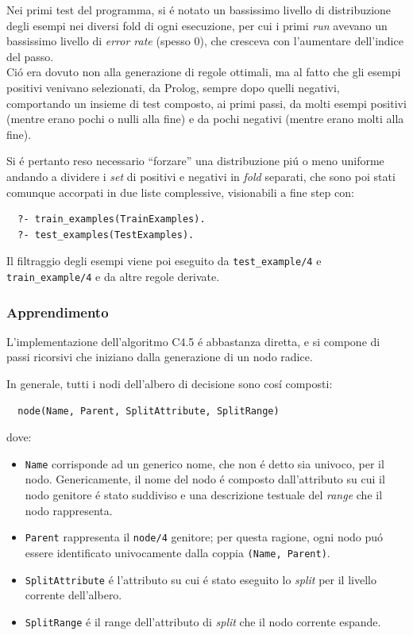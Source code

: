 \documentclass[preprint]{acm_proc_article-sp}
\begin{document}
Nei primi test del programma, si \'e notato un bassissimo livello di distribuzione degli esempi nei diversi fold di ogni esecuzione, per cui i primi \textit{run} avevano un bassissimo livello di \textit{error rate} (spesso $0$), che cresceva con l'aumentare dell'indice del passo.\\
Ci\'o era dovuto non alla generazione di regole ottimali, ma al fatto che gli esempi positivi venivano selezionati, da Prolog, sempre dopo quelli negativi, comportando un insieme di test composto, ai primi passi, da molti esempi positivi (mentre erano pochi o nulli alla fine) e da pochi negativi (mentre erano molti alla fine).

Si \'e pertanto reso necessario ``forzare'' una distribuzione pi\'u o meno uniforme andando a dividere i \textit{set} di positivi e negativi in \textit{fold} separati, che sono poi stati comunque accorpati in due liste complessive, visionabili a fine step con:
\begin{verbatim}
  ?- train_examples(TrainExamples).
  ?- test_examples(TestExamples).
\end{verbatim}

Il filtraggio degli esempi viene poi eseguito da \verb|test_example/4| e \verb|train_example/4| e da altre regole derivate.

\subsubsection{Apprendimento}
L'implementazione dell'algoritmo C4.5 \'e abbastanza diretta, e si compone di passi ricorsivi che iniziano dalla generazione di un nodo radice.

In generale, tutti i nodi dell'albero di decisione sono cos\'i composti:
\begin{verbatim}
  node(Name, Parent, SplitAttribute, SplitRange)
\end{verbatim}
dove:
\begin{itemize}
\item \verb|Name| corrisponde ad un generico nome, che non \'e detto sia univoco, per il nodo. Genericamente, il nome del nodo \'e composto dall'attributo su cui il nodo genitore \'e stato suddiviso e una descrizione testuale del \textit{range} che il nodo rappresenta.
\item \verb|Parent| rappresenta il \verb|node/4| genitore; per questa ragione, ogni nodo pu\'o essere identificato univocamente dalla coppia \verb|(Name, Parent)|.
\item \verb|SplitAttribute| \'e l'attributo su cui \'e stato eseguito lo \textit{split} per il livello corrente dell'albero.
\item \verb|SplitRange| \'e il range dell'attributo di \textit{split} che il nodo corrente espande.
\end{itemize}
\end{document}
